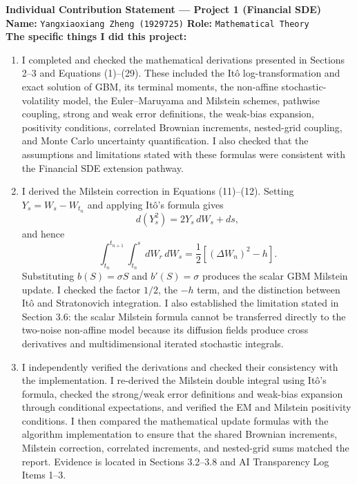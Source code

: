 \documentclass[11pt,a4paper]{article}
\theoremstyle{definition}
\theoremstyle{remark}
\begin{document}
\newpage



\begin{formbox}
\textbf{Individual Contribution Statement --- Project 1 (Financial SDE)}\\[0.4em]

\textbf{Name:} \texttt{Yangxiaoxiang Zheng (1929725)}
\hfill
\textbf{Role:} \texttt{Mathematical Theory}\\[0.4em]

\textbf{The specific things I did this project:}

\begin{enumerate}[leftmargin=2em]

\item I completed and checked the mathematical derivations presented in
Sections 2--3 and Equations (1)--(29). These included the It\^o
log-transformation and exact solution of GBM, its terminal moments, the
non-affine stochastic-volatility model, the Euler--Maruyama and Milstein
schemes, pathwise coupling, strong and weak error definitions, the weak-bias
expansion, positivity conditions, correlated Brownian increments, nested-grid
coupling, and Monte Carlo uncertainty quantification. I also checked that the
assumptions and limitations stated with these formulas were consistent with
the Financial SDE extension pathway.

\item I derived the Milstein correction in Equations (11)--(12). Setting
$Y_s=W_s-W_{t_n}$ and applying It\^o's formula gives
\[
  d(Y_s^2)=2Y_s\,dW_s+ds,
\]
and hence
\[
  \int_{t_n}^{t_{n+1}}\int_{t_n}^{s}dW_r\,dW_s
  =\frac{1}{2}\left[(\Delta W_n)^2-h\right].
\]
Substituting $b(S)=\sigma S$ and $b'(S)=\sigma$ produces the scalar GBM
Milstein update. I checked the factor $1/2$, the $-h$ term, and the distinction
between It\^o and Stratonovich integration. I also established the limitation
stated in Section 3.6: the scalar Milstein formula cannot be transferred
directly to the two-noise non-affine model because its diffusion fields
produce cross derivatives and multidimensional iterated stochastic integrals.

\item I independently verified the derivations and checked their consistency
with the implementation. I re-derived the Milstein double integral using
It\^o's formula, checked the strong/weak error definitions and weak-bias
expansion through conditional expectations, and verified the EM and Milstein
positivity conditions. I then compared the mathematical update formulas with
the algorithm implementation to ensure that the shared Brownian increments,
Milstein correction, correlated increments, and nested-grid sums matched the
report. Evidence is located in Sections 3.2--3.8 and AI Transparency Log
Items 1--3.


\end{enumerate}
\end{formbox}
\end{document}
